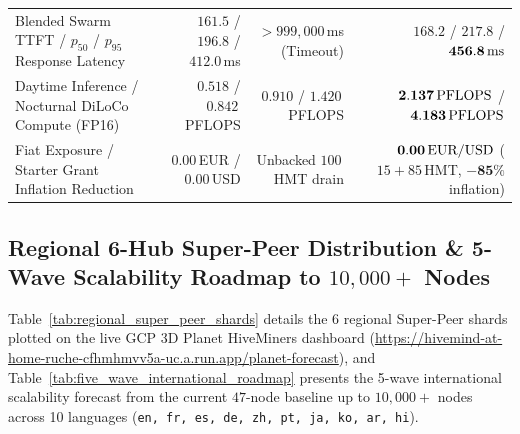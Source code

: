 \documentclass[11pt,a4paper]{article}
\begin{document}
\begin{table}[htbp!]
{\begin{tabular}{@{}lrrr@{}}
Blended Swarm TTFT / $p_{50}$ / $p_{95}$ Response Latency & $161.5$ / $196.8$ / $412.0$\,ms & $> 999{,}000$\,ms (Timeout) & $\mathbf{168.2}$ / $\mathbf{217.8}$ / $\mathbf{456.8\text{\,ms}}$ \\
Daytime Inference / Nocturnal DiLoCo Compute (FP16) & $0.518$ / $0.842$\,PFLOPS & $0.910$ / $1.420$\,PFLOPS & $\mathbf{2.137\text{\,PFLOPS}}$ / $\mathbf{4.183\text{\,PFLOPS}}$ \\
Fiat Exposure / Starter Grant Inflation Reduction & $0.00$\,EUR / $0.00$\,USD & Unbacked $100$\,HMT drain & $\mathbf{0.00\text{\,EUR/USD}}$ ($15+85$\,HMT, $\mathbf{-85\%}$ inflation) \\
\bottomrule
\end{tabular}%
}
\end{table}

\subsection{Regional 6-Hub Super-Peer Distribution \& 5-Wave Scalability Roadmap to $10{,}000+$ Nodes}
\label{sec:regional_super_peers_and_5wave_roadmap}

Table~\ref{tab:regional_super_peer_shards} details the 6 regional Super-Peer shards plotted on the live GCP 3D Planet HiveMiners dashboard (\url{https://hivemind-at-home-ruche-cfhmhmvv5a-uc.a.run.app/planet-forecast}), and Table~\ref{tab:five_wave_international_roadmap} presents the 5-wave international scalability forecast from the current $47$-node baseline up to $10{,}000+$ nodes across 10 languages (\texttt{en, fr, es, de, zh, pt, ja, ko, ar, hi}).
\end{document}
